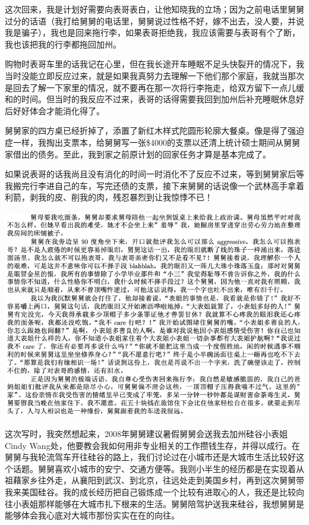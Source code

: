 \documentclass[9pt, b5paper]{article}
\begin{document}
这次回来，我是计划好需要向表哥表白，让他知晓我的立场；因为之前电话里舅舅过分的话语（我打给舅舅的电话里，舅舅说过性格不好，嫁不出去，没人要，并说我是骗子），我也是回来拖行李，如果表哥拒绝我，我应该需要与表哥有个了断，我也该把我的行李都拖回加州。

购物时表哥车里的话我记在心里，但在我长途开车睡眠不足头快裂开的情况下，我当时没能立即反应过来，就是如果我真努力去理解一下他们那个家庭，我就当那次是回去了解一下家里的情况，就不要再在那一次将行李拖走，给双方留下一点儿缓和的时间。但当时的我反应不过来，表哥的话得需要我回到加州后补充睡眠休息好后好好体会才能消化得了。

舅舅家的四方桌已经折掉了，添置了新红木样式陀圆形轮廓大餐桌。像是得了强迫症一样，我掏出支票本，给舅舅写一张\$4000的支票以还清上统计硕士期间从舅舅家借出的债务。至此，我到家之前原计划的回家任务才算是基本完成了。

如果说表哥的话我尚且没有消化的时间一时消化不了反应不过来，等到舅舅家后等我搬完行李进自己的车，写完还债的支票，接下来舅舅的话说像一个武林高手拿着利箭，剥我的皮、削我的肉，残忍暴烈到让我惊悸不已！

\begin{center}
\includegraphics[width=.9\linewidth]{./pic/p1p51.png}
\end{center}  

这次写时，我突然想起来，2008年舅舅建议暑假舅舅会送我去加州硅谷小表姐Cindy Wang处，他要教会我如何用非专业相关的工作攒钱生存，并得以成行。在舅舅与我轮流驾车开往硅谷的路上，我们讨论过在小城市还是大城市生活比较好这个话题。舅舅喜欢小城市的安宁、交通方便等。我则小半生的经历都是在实现着从祖藉家乡往外走，从襄阳到武汉、到北京，往远处走到美国乡村，再到这次舅舅带我来美国硅谷。我的成长经历把自己锻炼成一个比较有进取心的人，我还是比较向往小表姐那样能够在大城市扎下根来的生活。舅舅陪驾护送我来硅谷，我想舅舅是能够体会我心底对大城市那份实实在在的向往。
\end{document}
